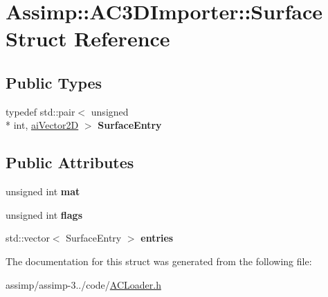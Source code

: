 \hypertarget{struct_assimp_1_1_a_c3_d_importer_1_1_surface}{\section{Assimp\+:\+:A\+C3\+D\+Importer\+:\+:Surface Struct Reference}
\label{struct_assimp_1_1_a_c3_d_importer_1_1_surface}
}
\subsection*{Public Types}
\begin{DoxyCompactItemize}
\item 
\hypertarget{struct_assimp_1_1_a_c3_d_importer_1_1_surface_aa3f44c4f6a00a60ab963fba2889f3ab2}{typedef std\+::pair$<$ unsigned \\*
int, \hyperlink{structai_vector2_d}{ai\+Vector2\+D} $>$ {\bfseries Surface\+Entry}}\label{struct_assimp_1_1_a_c3_d_importer_1_1_surface_aa3f44c4f6a00a60ab963fba2889f3ab2}

\end{DoxyCompactItemize}
\subsection*{Public Attributes}
\begin{DoxyCompactItemize}
\item 
\hypertarget{struct_assimp_1_1_a_c3_d_importer_1_1_surface_a5e332471cb1ae2ab0b400e0e93677e09}{unsigned int {\bfseries mat}}\label{struct_assimp_1_1_a_c3_d_importer_1_1_surface_a5e332471cb1ae2ab0b400e0e93677e09}

\item 
\hypertarget{struct_assimp_1_1_a_c3_d_importer_1_1_surface_aa1c14574447a0c5c14ff9e47ba72fea9}{unsigned int {\bfseries flags}}\label{struct_assimp_1_1_a_c3_d_importer_1_1_surface_aa1c14574447a0c5c14ff9e47ba72fea9}

\item 
\hypertarget{struct_assimp_1_1_a_c3_d_importer_1_1_surface_a79e23233abb2a933137135af4cd83bee}{std\+::vector$<$ Surface\+Entry $>$ {\bfseries entries}}\label{struct_assimp_1_1_a_c3_d_importer_1_1_surface_a79e23233abb2a933137135af4cd83bee}

\end{DoxyCompactItemize}


The documentation for this struct was generated from the following file\+:\begin{DoxyCompactItemize}
\item 
assimp/assimp-\/3../code/\hyperlink{_a_c_loader_8h}{A\+C\+Loader.\+h}\end{DoxyCompactItemize}

